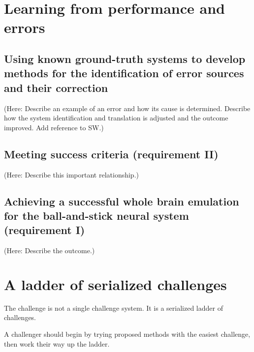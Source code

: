 \documentclass{ldr-article}
\begin{document}

\section{Learning from performance and errors}

\subsection{Using known ground-truth systems to develop methods for the identification of error sources and their correction}

(Here: Describe an example of an error and how its cause is determined. Describe how the system identification and translation is adjusted and the outcome improved. Add reference to SW.)

\subsection{Meeting success criteria (requirement II)}

(Here: Describe this important relationship.)

\subsection{Achieving a successful whole brain emulation for the ball-and-stick neural system (requirement I)}

(Here: Describe the outcome.)


\section{A ladder of serialized challenges}

The challenge is not a single challenge system. It is a serialized ladder of challenges.

A challenger should begin by trying proposed methods with the easiest challenge, then work their way up the ladder.
\end{document}
